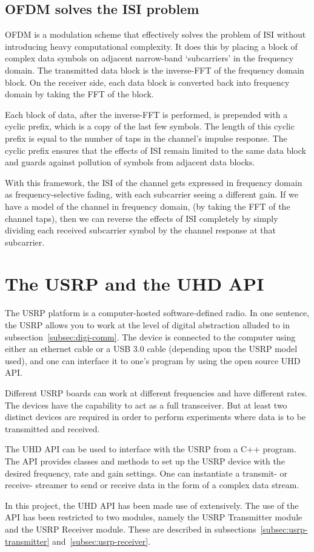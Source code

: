 \subsection{OFDM solves the ISI problem}

OFDM is a modulation scheme that effectively solves the problem of ISI without
introducing heavy computational complexity. It does this by placing a block of
complex data symbols on adjacent narrow-band `subcarriers' in the frequency
domain. The transmitted data block is the inverse-FFT of the frequency domain
block. On the receiver side, each data block is converted back into frequency
domain by taking the FFT of the block.

Each block of data, after the inverse-FFT is performed, is prepended with a
cyclic prefix, which is a copy of the last few symbols. The length of this
cyclic prefix is equal to the number of taps in the channel's impulse response.
The cyclic prefix ensures that the effects of ISI remain limited to the same
data block and guards against pollution of symbols from adjacent data blocks.

With this framework, the ISI of the channel gets expressed in frequency domain
as frequency-selective fading, with each subcarrier seeing a different gain.
If we have a model of the channel in frequency domain, (by taking the FFT of
the channel taps), then we can reverse the effects of ISI completely by simply
dividing each received subcarrier symbol by the channel response at that
subcarrier.


\section{The USRP and the UHD API}

The USRP platform is a computer-hosted software-defined radio. In one sentence,
the USRP allows you to work at the level of digital abstraction alluded to in
subsection~\ref{subsec:digi-comm}. The device is connected to the computer
using either an ethernet cable or a USB 3.0 cable (depending upon the USRP
model used), and one can interface it to one's program by using the open source
UHD API.

Different USRP boards can work at different frequencies and have different
rates. The devices have the capability to act as a full transceiver. But at
least two distinct devices are required in order to perform experiments where
data is to be transmitted and received.

The UHD API can be used to interface with the USRP from a C++ program. The API
provides classes and methods to set up the USRP device with the desired
frequency, rate and gain settings. One can instantiate a transmit- or receive-
streamer to send or receive data in the form of a complex data stream.

In this project, the UHD API has been made use of extensively. The use of the
API has been restricted to two modules, namely the USRP Transmitter module and
the USRP Receiver module. These are described in
subsections~\ref{subsec:usrp-transmitter} and~\ref{subsec:usrp-receiver}.

\cite{py:python}
